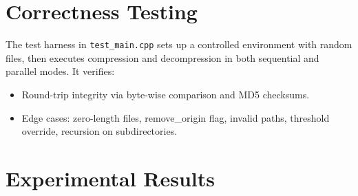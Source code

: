 \documentclass[10pt]{article}
\begin{document}
\section{Correctness Testing}
The test harness in \texttt{test\_main.cpp} sets up a controlled environment with random files, then executes compression and decompression in both sequential and parallel modes. It verifies:
\begin{itemize}\itemsep0pt
    \item Round-trip integrity via byte-wise comparison and MD5 checksums.
    \item Edge cases: zero-length files, remove\_origin flag, invalid paths, threshold override, recursion on subdirectories.
\end{itemize}

\section{Experimental Results}
\end{document}
